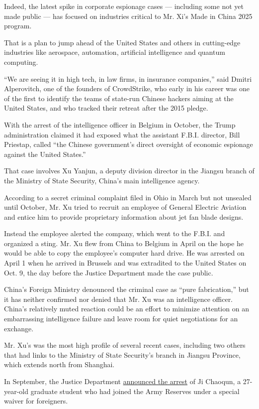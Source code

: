 Indeed, the latest spike in corporate espionage cases --- including some
not yet made public --- has focused on industries critical to Mr. Xi's
Made in China 2025 program.

That is a plan to jump ahead of the United States and others in
cutting-edge industries like aerospace, automation, artificial
intelligence and quantum computing.

``We are seeing it in high tech, in law firms, in insurance companies,''
said Dmitri Alperovitch, one of the founders of CrowdStrike, who early
in his career was one of the first to identify the teams of state-run
Chinese hackers aiming at the United States, and who tracked their
retreat after the 2015 pledge.

With the arrest of the intelligence officer in Belgium in October, the
Trump administration claimed it had exposed what the assistant F.B.I.
director, Bill Priestap, called ``the Chinese government's direct
oversight of economic espionage against the United States.''

That case involves Xu Yanjun, a deputy division director in the Jiangsu
branch of the Ministry of State Security, China's main intelligence
agency.

According to a secret criminal complaint filed in Ohio in March but not
unsealed until October, Mr. Xu tried to recruit an employee of General
Electric Aviation and entice him to provide proprietary information
about jet fan blade designs.

Instead the employee alerted the company, which went to the F.B.I. and
organized a sting. Mr. Xu flew from China to Belgium in April on the
hope he would be able to copy the employee's computer hard drive. He was
arrested on April 1 when he arrived in Brussels and was extradited to
the United States on Oct. 9, the day before the Justice Department made
the case public.

China's Foreign Ministry denounced the criminal case as ``pure
fabrication,'' but it has neither confirmed nor denied that Mr. Xu was
an intelligence officer. China's relatively muted reaction could be an
effort to minimize attention on an embarrassing intelligence failure and
leave room for quiet negotiations for an exchange.

Mr. Xu's was the most high profile of several recent cases, including
two others that had links to the Ministry of State Security's branch in
Jiangsu Province, which extends north from Shanghai.

In September, the Justice Department
\href{https://www.nytimes.com/2018/09/25/us/politics/ji-chaoqun-china-spy.html}{announced
the arrest} of Ji Chaoqun, a 27-year-old graduate student who had joined
the Army Reserves under a special waiver for foreigners.

